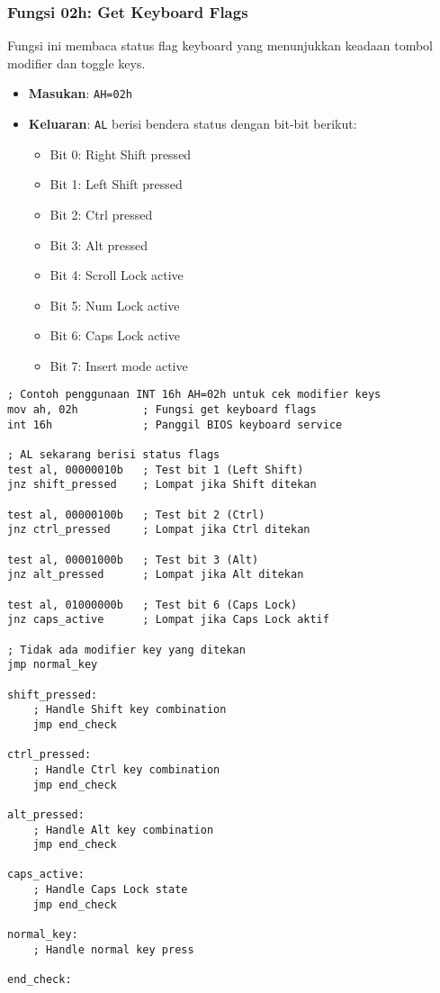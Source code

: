 \documentclass[../main.tex]{subfiles}
\begin{document}
\subsubsection{Fungsi 02h: Get Keyboard Flags}
Fungsi ini membaca status flag keyboard yang menunjukkan keadaan tombol modifier dan toggle keys.

\begin{itemize}
    \item \textbf{Masukan}: \texttt{AH=02h}
    \item \textbf{Keluaran}: \texttt{AL} berisi bendera status dengan bit-bit berikut:
        \begin{itemize}
            \item Bit 0: Right Shift pressed
            \item Bit 1: Left Shift pressed  
            \item Bit 2: Ctrl pressed
            \item Bit 3: Alt pressed
            \item Bit 4: Scroll Lock active
            \item Bit 5: Num Lock active
            \item Bit 6: Caps Lock active
            \item Bit 7: Insert mode active
        \end{itemize}
\end{itemize}

\begin{lstlisting}[language={[x86masm]Assembler}, caption=Fungsi 02h - Get Keyboard Flags, label={lst:int16h-02h}]
; Contoh penggunaan INT 16h AH=02h untuk cek modifier keys
mov ah, 02h          ; Fungsi get keyboard flags
int 16h              ; Panggil BIOS keyboard service

; AL sekarang berisi status flags
test al, 00000010b   ; Test bit 1 (Left Shift)
jnz shift_pressed    ; Lompat jika Shift ditekan

test al, 00000100b   ; Test bit 2 (Ctrl)
jnz ctrl_pressed     ; Lompat jika Ctrl ditekan

test al, 00001000b   ; Test bit 3 (Alt)
jnz alt_pressed      ; Lompat jika Alt ditekan

test al, 01000000b   ; Test bit 6 (Caps Lock)
jnz caps_active      ; Lompat jika Caps Lock aktif

; Tidak ada modifier key yang ditekan
jmp normal_key

shift_pressed:
    ; Handle Shift key combination
    jmp end_check
    
ctrl_pressed:
    ; Handle Ctrl key combination
    jmp end_check
    
alt_pressed:
    ; Handle Alt key combination
    jmp end_check
    
caps_active:
    ; Handle Caps Lock state
    jmp end_check
    
normal_key:
    ; Handle normal key press
    
end_check:
\end{lstlisting}
\end{document}
